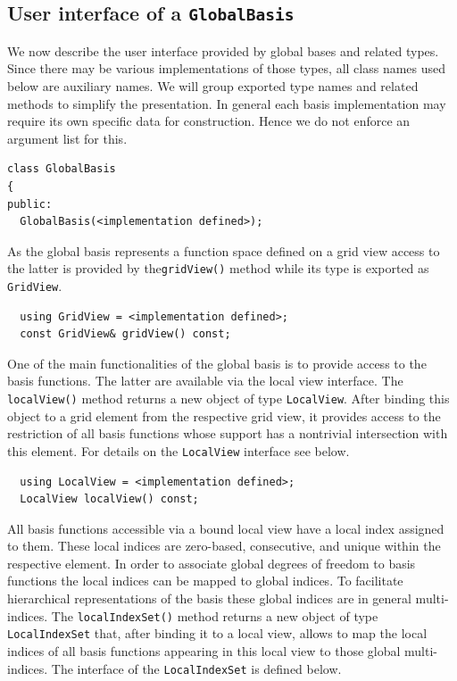 \documentclass[a4paper,10pt,headings=normal,bibliography=totoc]{scrartcl}
\begin{document}
\subsection{User interface of a \texttt{GlobalBasis}}
We now describe the user interface provided by global bases and related types.
Since there may be various implementations of those types, all class names used
below are auxiliary names.  We will group exported type names and related methods
to simplify the presentation.
In general each basis implementation may require its own specific data for construction.
Hence we do not enforce an argument list for this.

\begin{lstlisting}
class GlobalBasis
{
public:
  GlobalBasis(<implementation defined>);
\end{lstlisting}

As the global basis represents a function space defined on a grid view access to
the latter is provided by the\texttt{gridView()} method while its type
is exported as \texttt{GridView}.

\begin{lstlisting}
  using GridView = <implementation defined>;
  const GridView& gridView() const;
\end{lstlisting}

One of the main functionalities of the global basis is to provide
access to the basis functions. The latter are available via the
local view interface. The \texttt{localView()} method returns a new
object of type \texttt{LocalView}. After binding this object to a
grid element from the respective grid view, it provides access
to the restriction of all basis functions whose support has a
nontrivial intersection with this element. For details on the
\texttt{LocalView} interface see below.

\begin{lstlisting}
  using LocalView = <implementation defined>;
  LocalView localView() const;
\end{lstlisting}

All basis functions accessible via a bound local view have a
local index assigned to them. These local indices are zero-based,
consecutive, and unique within the respective element.
In order to  associate global degrees of freedom to basis functions
the local indices can be mapped to global indices. To facilitate
hierarchical representations of the basis these global indices
are in general multi-indices. The \texttt{localIndexSet()} method
returns a new object of type \texttt{LocalIndexSet} that, after
binding it to a local view, allows to map the local indices
of all basis functions appearing in this local view to those
global multi-indices. The interface of the \texttt{LocalIndexSet}
is defined below.
\end{document}

